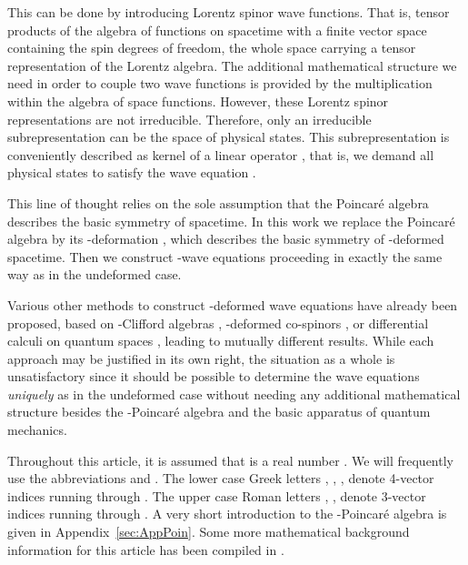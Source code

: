 \documentclass[12pt,a4paper]{article}
\begin{document}
This can be done by introducing Lorentz spinor wave functions. That
is, tensor products of the algebra of functions on spacetime with a
finite vector space containing the spin degrees of freedom, the whole
space carrying a tensor representation of the Lorentz algebra. The
additional mathematical structure we need in order to couple two wave
functions is provided by the multiplication within the algebra of
space functions. However, these Lorentz spinor representations are not
irreducible. Therefore, only an irreducible subrepresentation can be
the space of physical states. This subrepresentation is conveniently
described as kernel of a linear operator \coordHE{}, that is, we
demand all physical states \myHighlight{$\psi$}\coordHE{} to satisfy the wave equation
\coordHE{}.

This line of thought relies on the sole assumption that the
Poincar{\'e} algebra describes the basic symmetry of spacetime. In
this work we replace the Poincar\'e algebra by its \coordHE{}-deformation
\cite{Ogievetskii:1992a}, which describes the basic symmetry of
\coordHE{}-deformed spacetime. Then we construct \coordHE{}-wave equations
proceeding in exactly the same way as in the undeformed case.

Various other methods to construct \coordHE{}-deformed wave equations have
already been proposed, based on \coordHE{}-Clifford algebras
\cite{Schirrmacher:1992}, \coordHE{}-deformed co-spinors \cite{Pillin:1994b},
or differential calculi on quantum spaces
\cite{Song:1992,Meyer:1995,Podles:1996}, leading to mutually different
results. While each approach may be justified in its own right, the
situation as a whole is unsatisfactory since it should be possible to
determine the wave equations \emph{uniquely} as in the undeformed case
\cite{BarutRaczka} without needing any additional mathematical
structure besides the \coordHE{}-Poincar\'e algebra and the basic apparatus
of quantum mechanics.

Throughout this article, it is assumed that \coordHE{} is a real number
\coordHE{}. We will frequently use the abbreviations \coordHE{}
and \coordHE{}. The lower case Greek letters \myHighlight{$\mu$}\coordHE{}, \myHighlight{$\nu$}\coordHE{},
\myHighlight{$\sigma$}\coordHE{}, \myHighlight{$\tau$}\coordHE{} denote 4-vector indices running through \coordHE{}.
The upper case Roman letters \coordHE{}, \coordHE{}, \coordHE{} denote 3-vector indices
running through \coordHE{}. A very short introduction
to the \coordHE{}-Poincar{\'e} algebra is given in
Appendix~\ref{sec:AppPoin}. Some more mathematical background
information for this article has been compiled in \cite{Blohmann}.
\end{document}
